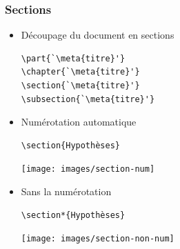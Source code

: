 \begin{frame}[fragile=singleslide]
  \frametitle{Sections}
  \begin{itemize}
  \item Découpage du document en sections
\begin{lstlisting}
\part{`\meta{titre}'}
\chapter{`\meta{titre}'}
\section{`\meta{titre}'}
\subsection{`\meta{titre}'}
\end{lstlisting}
  \item Numérotation automatique
    \begin{demo}
      \begin{minipage}{0.45\linewidth}
\begin{lstlisting}
\section{Hypothèses}
\end{lstlisting}
      \end{minipage}
      \hfill
      \begin{minipage}{0.45\linewidth}
        \texttt{[image: images/section-num]}
      \end{minipage}
    \end{demo}
  \item Sans la numérotation
    \begin{demo}
      \begin{minipage}{0.45\linewidth}
\begin{lstlisting}
\section*{Hypothèses}
\end{lstlisting}
      \end{minipage}
      \hfill
      \begin{minipage}{0.45\linewidth}
        \texttt{[image: images/section-non-num]}
      \end{minipage}
    \end{demo}
  \end{itemize}
\end{frame}

